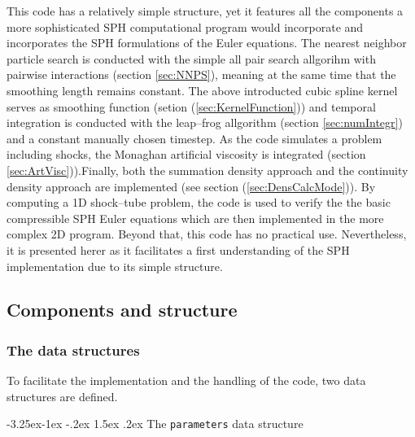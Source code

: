 \documentclass{report}
\makeatletter
\renewcommand\paragraph{\@startsection{paragraph}{4}{\z@}%
  {-3.25ex\@plus -1ex \@minus -.2ex}%
  {1.5ex \@plus .2ex}%
  {\normalfont\normalsize\bfseries}}
\makeatother
\begin{document}
This code has a relatively simple structure, yet it features all the components
a more sophisticated SPH computational program would incorporate and incorporates the SPH formulations of the Euler equations. The nearest neighbor particle search is conducted with the simple all pair search allgorihm with pairwise interactions (section \ref{sec:NNPS}), meaning at the same time that the smoothing length remains constant. The above introducted cubic spline kernel serves as smoothing function (setion (\ref{sec:KernelFunction})) and temporal integration is conducted with the leap--frog allgorithm (section \ref{sec:numIntegr}) and a constant manually chosen timestep. As the code simulates a problem including shocks, the Monaghan artificial viscosity is integrated (section \ref{sec:ArtVisc})).Finally, both the summation density approach and the continuity density approach are implemented (see section (\ref{sec:DensCalcMode})). 
By computing a 1D shock--tube problem, the code is used to verify the the basic compressible SPH Euler equations which are then implemented in the more complex 2D program. Beyond that, this code has no practical use. Nevertheless, it is presented herer as it facilitates a first understanding of the SPH implementation due to its simple structure.
  

\subsection{Components and structure}
\label{sec:CompAndStruc1DCode}

\subsubsection{The data structures}

To facilitate the implementation and the handling of the code, two data structures are defined. 

\paragraph{The {\tt parameters} data structure}
\end{document}
